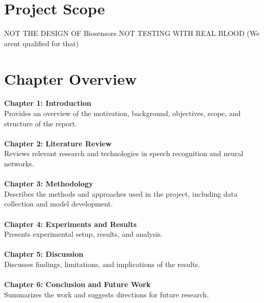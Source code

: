 \section{Project Scope}
NOT THE DESIGN OF Biosensors
NOT TESTING WITH REAL BLOOD (We arent qualified for that)

\section{Chapter Overview}

\textbf{\large Chapter 1: Introduction} \\
    Provides an overview of the motivation, background, objectives, scope, and structure of the report.
\\\\
\textbf{\large Chapter 2: Literature Review} \\
    Reviews relevant research and technologies in speech recognition and neural networks.
\\\\
\textbf{\large Chapter 3: Methodology} \\
    Describes the methods and approaches used in the project, including data collection and model development.
\\\\
\textbf{\large Chapter 4: Experiments and Results} \\
    Presents experimental setup, results, and analysis.
\\\\
\textbf{\large Chapter 5: Discussion} \\
    Discusses findings, limitations, and implications of the results.
\\\\
\textbf{\large Chapter 6: Conclusion and Future Work} \\
    Summarizes the work and suggests directions for future research.



